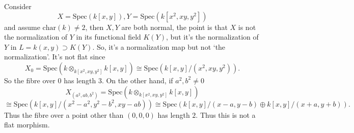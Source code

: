 \documentclass[../main.tex]{subfiles}
\begin{document}
\begin{example}
Consider $$X=\mathrm{Spec}(k[x,y]), Y=\mathrm{Spec}(k[x^2,xy,y^2])$$ and assume $\mathrm{char}(k)\neq 2$, then $X, Y$ are both normal, the point is that $X$ is not the normalization of $Y$ in its functional field $K(Y)$, but it's the normalization  of $Y$ in $L=k(x,y)\supset K(Y)$. So, it's a normalization map but not `the normalization'. It's not flat since 
$$X_{0}=\mathrm{Spec}(k\otimes_{k[x^{2},xy,y^{2}]}k[x,y])\cong \mathrm{Spec}(k[x,y]/(x^{2},xy,y^{2})).$$
So the fibre over $0$ has length $3$. On the other hand, if $a^{2},b^{2}\neq 0$
$$X_{(a^{2},ab ,b^{2})}=\mathrm{Spec}(k\otimes_{k[x^{2},xy,y^{2}]}k[x,y])$$
$$\cong \mathrm{Spec}(k[x,y]/(x^{2}-a^{2}, y^{2}-b^{2},xy-ab))\cong \mathrm{Spec}(k[x,y]/(x-a,y-b)\oplus k[x,y]/(x+a,y+b)).$$
Thus the fibre over a point other than $(0,0,0)$ has length $2$. Thus this is not a flat morphism.
\end{example}
\end{document}
